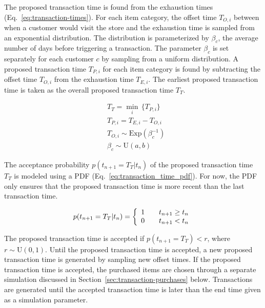 The proposed transaction time is found from the exhaustion times (Eq.~\ref{eq:transaction-times}).  For each item category, the offset time $T_{O, i}$ between when a customer would visit the store and the exhaustion time is sampled from an exponential distribution. The distribution is parameterized by $\beta_c$, the average number of days before triggering a transaction. The parameter $\beta_c$ is set separately for each customer $c$ by sampling from a uniform distribution. A proposed transaction time $T_{P, i}$ for each item category is found by subtracting the offset time $T_{O, i}$ from the exhaustion time $T_{E, i}$.  The earliest proposed transaction time is taken as the overall proposed transaction time $T_T$.

\begin{align} \label{eq:transaction-times}
&T_T = \min_i \, \{  T_{P, i}\} \\
&T_{P, i} = T_{E,i} - T_{O, i} \nonumber\\
&T_{O, i} \sim \text{Exp}(\beta^{-1}_c) \nonumber \\
&\beta_c \sim \text{U}(a, b) \nonumber
\end{align}

The acceptance probability $p(t_{n+1}=T_T|t_n)$ of the proposed transaction time $T_T$ is modeled using a PDF (Eq.~\ref{eq:transaction_time_pdf}). For now, the PDF only ensures that the proposed transaction time is more recent than the last transaction time.


\begin{equation} \label{eq:transaction_time_pdf}
p(t_{n+1}=T_T|t_n) = \left\{ 
  \begin{array}{l l}
   1 & \quad t_{n+1} \geq t_n\\
   0 & \quad t_{n+1} < t_n
  \end{array} \right.
\end{equation}

The proposed transaction time is accepted if $p(t_{n+1}=T_T) < r$, where $r \sim \text{U}(0, 1)$. Until the proposed transaction time is accepted, a new proposed transaction time is generated by sampling new offset times. If the proposed transaction time is accepted, the purchased items are chosen through a separate simulation discussed in Section~\ref{sec:transaction-purchases} below. Transactions are generated until the accepted transaction time is later than the end time given as a simulation parameter.

